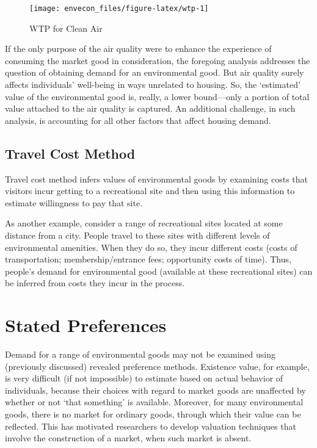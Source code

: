 \documentclass[
]{book}
\begin{document}
\begin{figure}

{\centering \texttt{[image: envecon\_files/figure-latex/wtp-1]} 

}

\caption{WTP for Clean Air}\label{fig:wtp}
\end{figure}

If the only purpose of the air quality were to enhance the experience of consuming the market good in consideration, the foregoing analysis addresses the question of obtaining demand for an environmental good. But air quality surely affects individuals' well-being in ways unrelated to housing. So, the `estimated' value of the environmental good is, really, a lower bound---only a portion of total value attached to the air quality is captured. An additional challenge, in such analysis, is accounting for all other factors that affect housing demand.

\hypertarget{travel-cost-method}{%
\subsection{Travel Cost Method}\label{travel-cost-method}}

Travel cost method infers values of environmental goods by examining costs that visitors incur getting to a recreational site and then using this information to estimate willingness to pay that site.

As another example, consider a range of recreational sites located at some distance from a city. People travel to these sites with different levels of environmental amenities. When they do so, they incur different costs (costs of transportation; membership/entrance fees; opportunity costs of time). Thus, people's demand for environmental good (available at these recreational sites) can be inferred from costs they incur in the process.

\hypertarget{stated-preferences}{%
\section{Stated Preferences}\label{stated-preferences}}

Demand for a range of environmental goods may not be examined using (previously discussed) revealed preference methods. Existence value, for example, is very difficult (if not impossible) to estimate based on actual behavior of individuals, because their choices with regard to market goods are unaffected by whether or not `that something' is available. Moreover, for many environmental goods, there is no market for ordinary goods, through which their value can be reflected. This has motivated researchers to develop valuation techniques that involve the construction of a market, when such market is absent.
\end{document}
